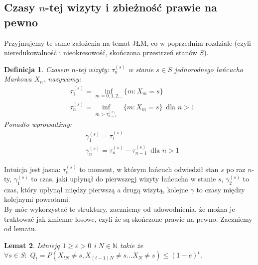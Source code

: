 \documentclass[a4paper]{article}
\theoremstyle{defn}
\newtheorem{defn}{Definicja}[subsection]
\theoremstyle{theorem}
\theoremstyle{lemma}
\newtheorem{lemma}[defn]{Lemat}
\theoremstyle{cor}
\theoremstyle{fact}
\begin{document}
\subsection{Czasy $n$-tej wizyty i zbieżność prawie na pewno}
\label{sect2.5}
Przyjmujemy te same założenia na temat JŁM, co w poprzednim rozdziale (czyli nieredukowalność i nieokresowość, skończona przestrzeń stanów $S$).
\begin{defn}\label{defn2.5.1}
Czasem $n$-tej wizyty:  $\tau_n^{(s)}$  w stanie $s \in S$ jednorodnego łańcucha Markowa $X_n$. nazywamy:\\
\begin{align*}
&\tau_1^{(s)} = \inf_{m = 0,1,2...} \{m: X_m = s\}\\
&\tau_n^{(s)} = \inf_{m > \tau_{n-1}^{(s)}} \,\,\,\,\{m: X_m = s\} \,\,\, \text{dla $n > 1$}
\end{align*}
Ponadto wprowadźmy:
\begin{align*}
    &\gamma_1^{(s)} = \tau_1^{(s)}\\
    &\gamma_n^{(s)} = \tau_n^{(s)} - \tau_{n-1}^{(s)}\,\,\,\text{dla $n > 1$}
\end{align*}
\end{defn}
Intuicja jest jasna: $\tau_n^{(s)}$ to moment, w którym łańcuch odwiedził stan $s$ po raz $n$-ty, $\gamma_1^{(s)}$ to czas, jaki upłynął do pierwszegj wizyty łańcucha w stanie $s$, $\gamma_2^{(s)}$ to czas, który upłynął między pierwszą a drugą wizytą, kolejne $\gamma$ to czasy między kolejnymi powrotami.\\
By móc wykorzystać te struktury, zaczniemy od udowodnienia, że można je traktować jak zmienne losowe, czyli że są skończone prawie na pewno. Zaczniemy od lematu.
\begin{lemma}\label{lemma2.5.2}
Istnieją $1 \geq \varepsilon > 0$ i $N \in \mathbb{N}$ takie że $\forall s \in S: \,\, Q_t = P(X_{tN} \neq s, X_{(t-1)N} \neq s ... X_N \neq s) \leq (1-e)^t$.
\end{lemma}
\end{document}
